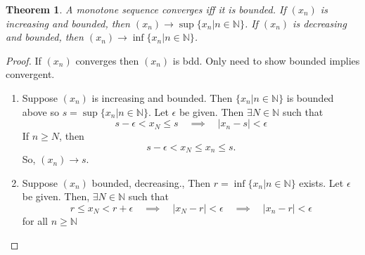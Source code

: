 \documentclass{report}
\newcommand{\N}{\mathbb{N}}  %
\theoremstyle{mystyle}
\newtheorem*{theorem}{Theorem}
\theoremstyle{customtheorem}
\begin{document}
    \begin{theorem}
        A monotone sequence converges iff it is bounded. If $(x_n)$ is increasing and bounded, then $(x_n)\rightarrow \sup\{x_n\vert n\in\N\}$. If $(x_n)$ is decreasing and bounded, then $(x_n)\rightarrow \inf\{x_n\vert n\in\N\}$.
    \end{theorem}

    \begin{proof}
        If $(x_n)$ converges then $(x_n)$ is bdd.  Only need to show bounded implies convergent.
        \begin{enumerate}[label=(\roman*)]
            \item Suppose $(x_n)$ is increasing and bounded. Then $\{x_n\vert n\in\N\}$ is bounded above so $s=\sup\{x_n\vert n\in\N\}$.
            Let $\epsilon$ be given. Then $\exists N \in \N$ such that \[s-\epsilon < x_N \leq s\quad\implies\quad \vert x_n-s \vert < \epsilon\]
            If $n\geq N$, then \[s-\epsilon < x_N \leq x_n \leq s.\] So, $(x_n)\rightarrow s$.
            \item Suppose $(x_n)$ bounded, decreasing., Then $r=\inf\{x_n\vert n\in\N\}$ exists. Let $\epsilon$ be given. Then, $\exists N \in \N$ such that
            \[ r \leq x_N < r+\epsilon \quad\implies\quad |x_N-r|<\epsilon\quad\implies\quad |x_n-r|<\epsilon\]for all $n\geq \N$
        \end{enumerate}
    \end{proof}
\end{document}
